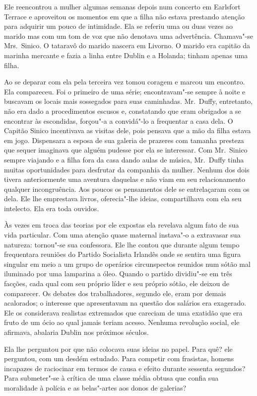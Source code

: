 Ele reencontrou a mulher algumas semanas depois num concerto em Earlsfort
Terrace e aproveitou os momentos em que a filha não estava prestando atenção
para adquirir um pouco de intimidade.  Ela se referiu uma ou duas vezes ao
marido mas com um tom de voz que não denotava uma advertência.  Chamava"-se 
Mrs.~Sinico.  O tataravô do marido nascera em Livorno.  O marido era capitão da
marinha mercante e fazia a linha entre Dublin e a Holanda; tinham apenas uma
filha.

Ao se deparar com ela pela terceira vez tomou coragem e marcou um encontro.
Ela compareceu.  Foi o primeiro de uma série; encontravam"-se sempre à noite e
buscavam os locais mais sossegados para suas caminhadas.  Mr.~Duffy,
entretanto, não era dado a procedimentos escusos e, constatando que eram
obrigados a se encontrar às escondidas, forçou"-a a convidá"-lo a frequentar a
casa dela.  O Capitão Sinico incentivava as visitas dele, pois pensava que a
mão da filha estava em jogo.  Dispensara a esposa de sua galeria de prazeres
com tamanha presteza que sequer imaginava que alguém pudesse por ela se
interessar.  Com Mr.~Sinico sempre viajando e a filha fora da casa dando aulas
de música, Mr.~Duffy tinha muitas oportunidades para desfrutar da companhia da
mulher.  Nenhum dos dois tivera anteriormente uma aventura daquelas e não viam
em seu relacionamento qualquer incongruência.  Aos poucos os pensamentos dele
se entrelaçaram com os dela.  Ele lhe emprestava livros, oferecia"-lhe ideias,
compartilhava com ela seu intelecto.  Ela era toda ouvidos.

Às vezes em troca das teorias por ele expostas ela revelava algum fato de sua
vida particular.  Com uma atenção quase maternal instava"-o a extravasar sua
natureza: tornou"-se sua confessora.  Ele lhe contou que durante algum tempo
frequentara reuniões do Partido Socialista Irlandês onde se sentira uma figura
singular em meio a um grupo de operários circunspectos reunidos num sótão mal
iluminado por uma lamparina a óleo.  Quando o partido dividiu"-se em três
facções, cada qual com seu próprio líder e seu próprio sótão, ele deixou de
comparecer.  Os debates dos trabalhadores, segundo ele, eram por demais
acalorados; o interesse que apresentavam na questão dos salários era exagerado.
Ele os considerava realistas extremados que careciam de uma exatidão que era
fruto de um ócio ao qual jamais teriam acesso.  Nenhuma revolução social, ele
afirmava, abalaria Dublin nos próximos séculos.

Ela lhe perguntou por que não colocava suas ideias no papel.  Para quê?  ele
perguntou, com um desdém estudado.  Para competir com frasistas, homens
incapazes de raciocinar em termos de causa e efeito durante sessenta segundos?
Para submeter"-se à crítica de uma classe média obtusa que confia sua moralidade
à polícia e as belas"-artes aos donos de galerias?


